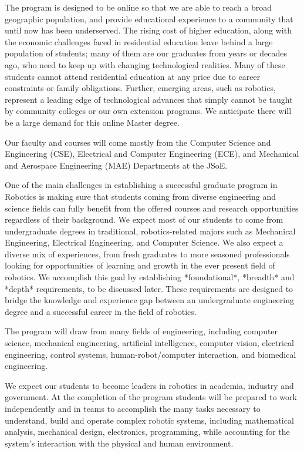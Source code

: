 \documentclass[11pt,letterpaper]{article}
\begin{document}
The program is designed to be online so that we are able to reach a
broad geographic population, and provide educational experience to a
community that until now has been underserved. The rising cost of
higher education, along with the economic challenges faced in
residential education leave behind a large population of students;
many of them are our graduates from years or decades ago, who need to
keep up with changing technological realities. Many of these students
cannot attend residential education at any price due to career
constraints or family obligations. Further, emerging areas, such as
robotics, represent a leading edge of technological advances that
simply cannot be taught by community colleges or our own extension
programs. We anticipate there will be a large demand for this online
Master degree.

Our faculty and courses will come mostly from the Computer Science and
Engineering (CSE), Electrical and Computer Engineering (ECE), and
Mechanical and Aerospace Engineering (MAE) Departments at the JSoE.

One of the main challenges in establishing a successful graduate
program in Robotics is making sure that students coming from diverse
engineering and science fields can fully benefit from the offered
courses and research opportunities regardless of their background. We
expect most of our students to come from undergraduate degrees in
traditional, robotics-related majors such as Mechanical Engineering,
Electrical Engineering, and Computer Science. We also expect a diverse
mix of experiences, from fresh graduates to more seasoned
professionals looking for opportunities of learning and growth in the
ever present field of robotics. We accomplish this goal by
establishing *foundational*, *breadth* and *depth* requirements, to be
discussed later. These requirements are designed to bridge the
knowledge and experience gap between an undergraduate engineering
degree and a successful career in the field of robotics.

The program will draw from many fields of engineering, including
computer science, mechanical engineering, artificial intelligence,
computer vision, electrical engineering, control systems,
human-robot/computer interaction, and biomedical engineering. 

We expect our students to become leaders in robotics in academia,
industry and government. At the completion of the program students
will be prepared to work independently and in teams to accomplish the
many tasks necessary to understand, build and operate complex robotic
systems, including mathematical analysis, mechanical design,
electronics, programming, while accounting for the system's
interaction with the physical and human environment.
\end{document}
